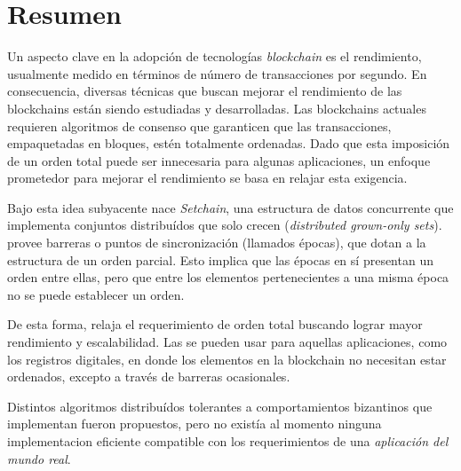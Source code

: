   \chapter*{Resumen}
  Un aspecto clave en la adopción de tecnologías \textit{blockchain} es el rendimiento,
  usualmente medido en términos de número de transacciones por segundo.
  En consecuencia, diversas técnicas que buscan mejorar el rendimiento de las blockchains
  están siendo estudiadas y desarrolladas.
  Las blockchains actuales requieren algoritmos de consenso que garanticen que las
  transacciones, empaquetadas en bloques, estén totalmente ordenadas.
  Dado que esta imposición de un orden total puede ser innecesaria para algunas aplicaciones,
  un enfoque prometedor para mejorar el rendimiento se basa en relajar esta exigencia.

  Bajo esta idea subyacente nace \textit{Setchain}, una estructura de
  datos concurrente que implementa conjuntos distribuídos que solo crecen
  (\textit{distributed grown-only sets}).
  \setchain provee barreras o puntos de sincronización
  (llamados épocas), que dotan a la estructura de un orden parcial.
  Esto implica que las épocas en sí presentan un orden entre ellas,
  pero que entre los elementos pertenecientes a una misma época no
  se puede establecer un orden.

  De esta forma, relaja el requerimiento de orden total buscando lograr mayor
  rendimiento y escalabilidad.
  Las \setchains se pueden usar para aquellas aplicaciones, como los registros digitales,
  en donde los elementos en la blockchain no necesitan estar ordenados, excepto a través
  de barreras ocasionales.
  
  
  Distintos algoritmos distribuídos tolerantes a comportamientos bizantinos que
  implementan \setchain fueron propuestos, pero no existía al momento ninguna
  implementacion eficiente compatible con
  los requerimientos de una \textit{aplicación del mundo real}.
  
